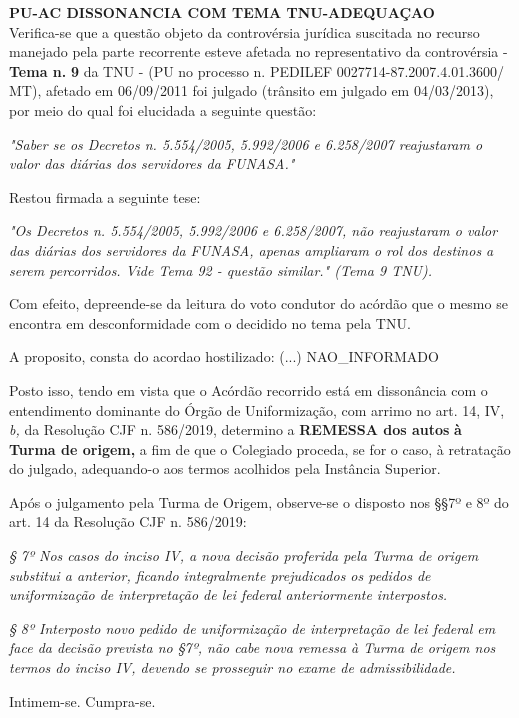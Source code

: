 \documentclass[12pt]{article}
\begin{document}
\justifying
{\Large\bfseries \textbf{PU-AC }\textbf{DISSONANCIA}\textbf{ COM TEMA TNU-}\textbf{ADEQUAÇAO}}\\

\noindent Verifica-se que a questão objeto da controvérsia jurídica suscitada no recurso manejado pela parte recorrente esteve afetada no representativo da controvérsia - \textbf{Tema n. }\textbf{9} da TNU - (PU no processo n. PEDILEF 0027714-87.2007.4.01.3600/ MT),  afetado em 06/09/2011 foi julgado (trânsito em julgado em 04/03/2013), por meio do qual foi elucidada a seguinte questão:

\noindent \textit{"Saber se os Decretos n. 5.554/2005, 5.992/2006 e 6.258/2007 reajustaram o valor das diárias dos servidores da FUNASA."}

\noindent Restou firmada a seguinte tese:

\noindent \textit{"Os Decretos n. 5.554/2005, 5.992/2006 e 6.258/2007, não reajustaram o valor das diárias dos servidores da FUNASA, apenas ampliaram o rol dos destinos a serem percorridos. Vide Tema 92 - questão similar." (Tema 9 TNU).}

\noindent Com efeito, depreende-se da leitura do voto condutor do acórdão que o mesmo se encontra em desconformidade com o decidido no  tema pela TNU.

\noindent A proposito, consta do acordao hostilizado: (...) NAO\_INFORMADO

\noindent Posto isso, tendo em vista que o Acórdão recorrido está em dissonância com o entendimento dominante do Órgão de Uniformização, com arrimo no art. 14, IV, \textit{b,} da Resolução CJF n. 586/2019, determino a \textbf{REMESSA dos autos} \textbf{à Turma de origem, }a fim de que o Colegiado proceda, se for o caso, à retratação do julgado, adequando-o aos termos acolhidos pela Instância Superior.

\noindent Após o julgamento pela Turma de Origem, observe-se o disposto nos §§7º e 8º do art. 14 da Resolução CJF n. 586/2019:

\noindent \textit{§ 7º Nos casos do inciso IV, a nova decisão proferida pela Turma de origem substitui a anterior, ficando integralmente prejudicados os pedidos de uniformização de interpretação de lei federal anteriormente interpostos.}

\noindent \textit{§ 8º Interposto novo pedido de uniformização de interpretação de lei federal em face da decisão prevista no §7º, não cabe nova remessa à Turma de origem nos termos do inciso IV, devendo se prosseguir no exame de admissibilidade.}

\noindent Intimem-se. Cumpra-se.
\end{document}
